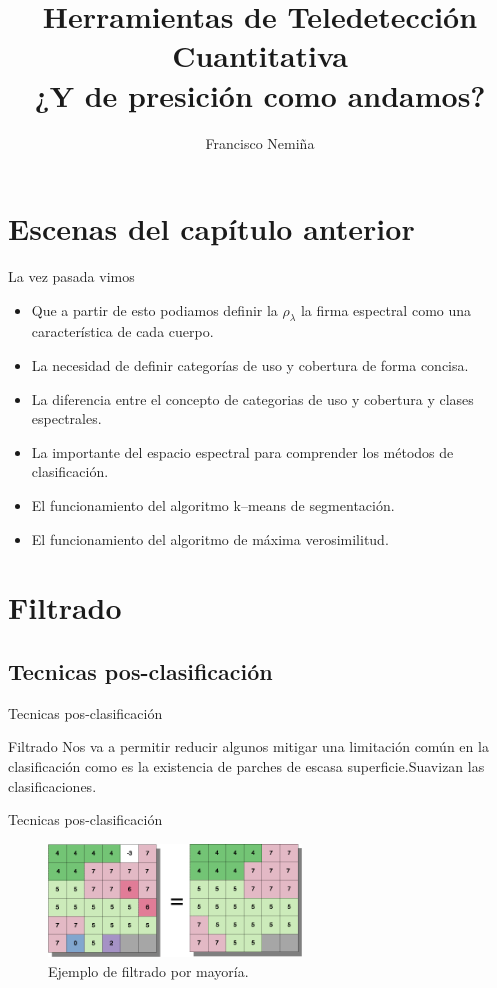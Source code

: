 \documentclass[handout]{beamer}
\title{Herramientas de Teledetección Cuantitativa\\{\small¿Y de presición como andamos?}}
\author{Francisco Nemiña}
\institute{Unidad de Educación y Formación Masiva \\
Comisión Nacional de Actividades Espaciales}
\begin{document}
\begin{frame}
    \maketitle
\end{frame}

\section{Escenas del capítulo anterior}
\begin{frame}{La vez pasada vimos}
  \begin{itemize}[<+->]
    \item Que a partir de esto podiamos definir la $\rho_\lambda$ la firma espectral como una característica de cada cuerpo.
    \item La necesidad de definir categorías de uso y cobertura de forma concisa.
    \item La diferencia entre el concepto de categorias de uso y cobertura y clases espectrales.
    \item La importante del espacio espectral para comprender los métodos de clasificación.
    \item El funcionamiento del algoritmo k--means de segmentación.
    \item El funcionamiento del algoritmo de máxima verosimilitud.
  \end{itemize}
\end{frame}

\section{Filtrado}
\subsection{Tecnicas pos-clasificación}

\begin{frame}{Tecnicas pos-clasificación}
  \begin{block}{Filtrado}
    Nos va a permitir reducir algunos mitigar una limitación común en la clasificación como es la existencia de parches de escasa superficie.\pause  Suavizan las clasificaciones.
  \end{block}
\end{frame}

\begin{frame}{Tecnicas pos-clasificación}
  \begin{figure}
    \includegraphics[width=0.6\textwidth]{imagenes/filter.png}
    \caption{Ejemplo de filtrado por mayoría.}
  \end{figure}
\end{frame}
\end{document}
